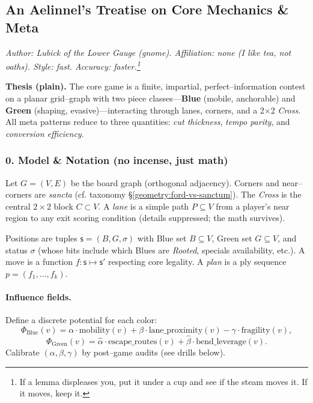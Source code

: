 \documentclass[11pt]{article}
\begin{document}
\begin{itemize}
\clearpage
\section{An Aelinnel’s Treatise on Core Mechanics \& Meta}
\label{geometry:aelinnel-core}

\noindent\textit{Author: Lubick of the Lower Gauge (gnome). Affiliation: none (I like tea, not oaths). Style: fast. Accuracy: faster.\footnote{If a lemma displeases you, put it under a cup and see if the steam moves it. If it moves, keep it.}}

\medskip
\noindent\textbf{Thesis (plain).} The core game is a finite, impartial, perfect–information contest on a planar grid–graph with two piece classes—\textbf{Blue} (mobile, anchorable) and \textbf{Green} (shaping, evasive)—interacting through lanes, corners, and a 2\(\times\)2 \emph{Cross}. All meta patterns reduce to three quantities: \emph{cut thickness}, \emph{tempo parity}, and \emph{conversion efficiency}.

\subsubsection{0. Model \& Notation (no incense, just math)}
Let \(G=(V,E)\) be the board graph (orthogonal adjacency). Corners and near–corners are \emph{sancta} (cf. taxonomy \S\ref{geometry:ford-vs-sanctum}). The \emph{Cross} is the central \(2\times2\) block \(C\subset V\). A \emph{lane} is a simple path \(P\subseteq V\) from a player’s near region to any exit scoring condition (details suppressed; the math survives). 

Positions are tuples \(\mathsf{s}=(B,G,\sigma)\) with Blue set \(B\subseteq V\), Green set \(G\subseteq V\), and status \(\sigma\) (whose bits include which Blues are \emph{Rooted}, specials availability, etc.). A move is a function \(f:\mathsf{s}\mapsto \mathsf{s}'\) respecting core legality. A \emph{plan} is a ply sequence \(p=(f_1,\dots,f_k)\).

\paragraph{Influence fields.} Define a discrete potential for each color:
\[
\Phi_{\text{Blue}}(v)= \alpha\cdot \text{mobility}(v) + \beta\cdot \text{lane\_proximity}(v) - \gamma\cdot \text{fragility}(v),
\]
\[
\Phi_{\text{Green}}(v)= \hat{\alpha}\cdot \text{escape\_routes}(v) + \hat{\beta}\cdot \text{bend\_leverage}(v).
\]
Calibrate \((\alpha,\beta,\gamma)\) by post–game audits (see drills below).


\end{itemize}
\end{document}
